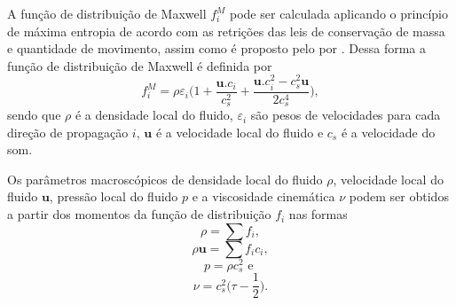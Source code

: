 A função de distribuição de Maxwell $f_{i}^{M}$ pode ser calculada aplicando o princípio de máxima entropia de acordo com as retrições das leis de conservação de massa e quantidade de movimento, assim como é proposto pelo por . Dessa forma a função de distribuição de Maxwell é definida por
\begin{equation}
	f_{i}^{M} = \rho \varepsilon _{i}\bigg( 1 + \frac{\textbf{u}.c_{i}}{c_{s}^{2}} + \frac{\textbf{u}.c_{i}^{2} - c_{s}^{2}\textbf{u}}{2c_{s}^{4}}\bigg),
    \label{eq:f_i_M}
\end{equation}
sendo que $\rho$ é a densidade local do fluido, $\varepsilon_{i}$ são pesos de velocidades para cada direção de propagação $i$, $\textbf{u}$ é a velocidade local do fluido e $c_{s}$ é a velocidade do som.

\newpage
Os parâmetros macroscópicos de densidade local do fluido $\rho$, velocidade local do fluido $\textbf{u}$, pressão local do fluido $p$ e a viscosidade cinemática $\nu$ podem ser obtidos a partir dos momentos da função de distribuição $f_{i}$ nas formas
\begin{equation}
	\rho = \sum{f_{i}},
    \label{eq:rho}
\end{equation}
\begin{equation}
	\rho \textbf{u} = \sum{f_{i} c_{i}},
    \label{eq:u}
\end{equation}
\begin{equation}
	p = \rho c^{2}_{s} \text{ e }
    \label{eq:p}
\end{equation}
\begin{equation}
	\nu = c^{2}_{s} \bigg(\tau - \frac{1}{2}\bigg).
    \label{eq:nu}
\end{equation}



